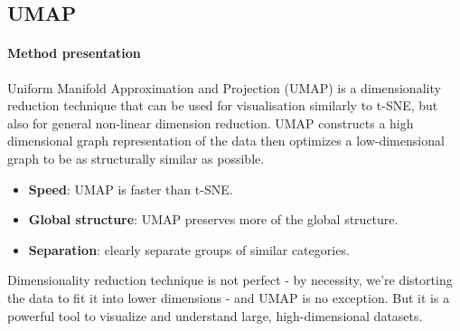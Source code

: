 \documentclass{article}
\theoremstyle{plain}
\theoremstyle{definition}
\theoremstyle{remark}
\begin{document}
\subsection{UMAP}
\paragraph{Method presentation}
Uniform Manifold Approximation and Projection (UMAP) is a dimensionality 
reduction technique that can be used for visualisation similarly to t-SNE,
but also for general non-linear dimension reduction.
UMAP constructs a high dimensional graph representation of the data 
then optimizes a low-dimensional graph to be as structurally similar as possible.

\begin{itemize}
    \item \textbf{Speed}: UMAP is faster than t-SNE.
    \item \textbf{Global structure}: UMAP preserves more of the global structure.
    \item \textbf{Separation}: clearly separate groups of similar categories.
\end{itemize}
Dimensionality reduction technique is not perfect - by necessity, we're distorting
 the data to fit it into lower dimensions - and UMAP is no exception. 
 But it is a powerful tool to visualize and understand large, high-dimensional datasets.
\end{document}
